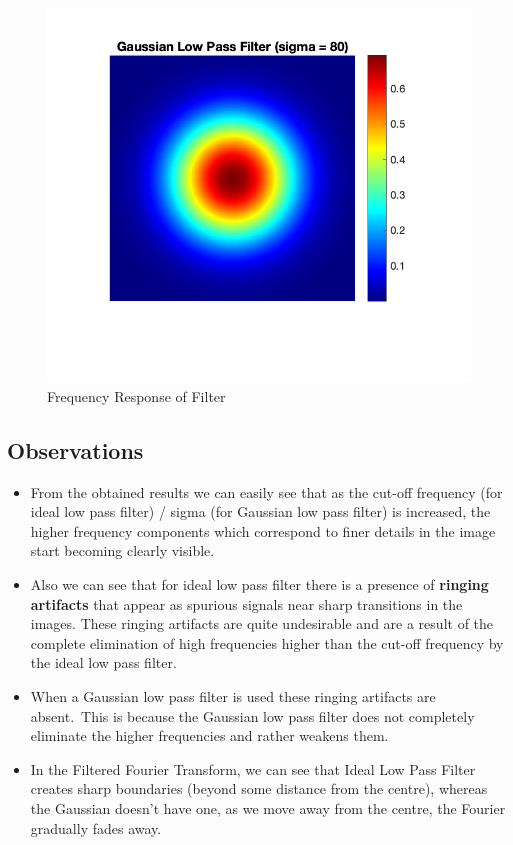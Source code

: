 \documentclass[12pt]{article}
\begin{document}
\begin{figure}[H]
    \centering
    \includegraphics{../images/gaussian_LPF_80.png}
    \caption{Frequency Response of Filter}
\end{figure}

\subsection*{Observations}

\begin{itemize}
    \item From the obtained results we can easily see that as the cut-oﬀ frequency (for ideal low pass
    ﬁlter) / sigma (for Gaussian low pass ﬁlter) is increased, the higher frequency components
    which correspond to ﬁner details in the image start becoming clearly visible.
    \item Also we can see that for ideal low pass ﬁlter there is a presence of \textbf{ringing artifacts} that appear
    as spurious signals near sharp transitions in the images. These ringing artifacts are quite
    undesirable and are a result of the complete elimination of high frequencies higher than the
    cut-oﬀ frequency by the ideal low pass ﬁlter.
    \item When a Gaussian low pass ﬁlter is used these ringing artifacts are absent.\ This is because the
    Gaussian low pass ﬁlter does not completely eliminate the higher frequencies and rather weakens
    them.
    \item In the Filtered Fourier Transform, we can see that Ideal Low Pass Filter creates sharp boundaries (beyond some distance from the centre), whereas the Gaussian doesn't have one, as we move away from the centre, the Fourier gradually fades away.
\end{itemize}
\end{document}
